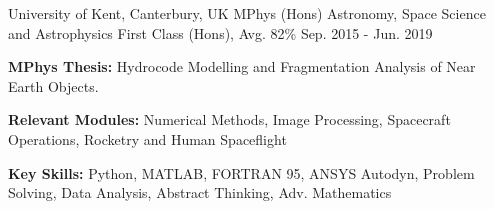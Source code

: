

\begin{cventries}


  \cventry
    {University of Kent, Canterbury, UK} %
    {MPhys (Hons) Astronomy, Space Science and Astrophysics} %
    {First Class (Hons), Avg. 82\%} %
    {Sep. 2015 - Jun. 2019} %
    {
      \begin{cvitems} %
         \item {\textbf{MPhys Thesis:} Hydrocode Modelling and Fragmentation Analysis of Near Earth Objects.}
         \item {\textbf{Relevant Modules:} Numerical Methods, Image Processing, Spacecraft Operations, Rocketry and Human Spaceflight}
         \item {\textbf{Key Skills:} Python, MATLAB, FORTRAN 95, ANSYS Autodyn, Problem Solving, Data Analysis, Abstract Thinking, Adv. Mathematics}
      \end{cvitems}
    }

\end{cventries}

